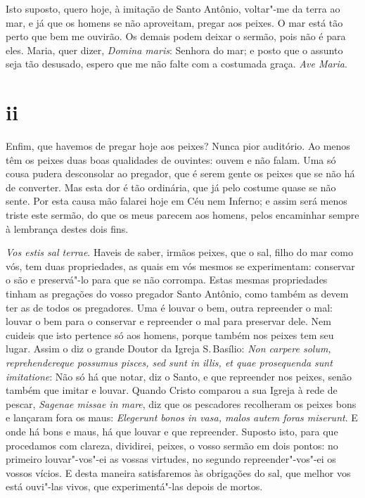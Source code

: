 Isto suposto, quero hoje, à imitação de Santo Antônio, voltar"-me da
terra ao mar, e já que os homens se não aproveitam, pregar aos peixes. O
mar está tão perto que bem me ouvirão. Os demais podem deixar o sermão,
pois não é para eles. Maria, quer dizer, \emph{Domina maris}: Senhora
do mar; e posto que o assunto seja tão desusado, espero que me não
falte com a costumada graça. \emph{Ave Maria}.

\section{ii}

Enfim, que havemos de pregar hoje aos peixes? Nunca pior auditório. Ao
menos têm os peixes duas boas qualidades de ouvintes: ouvem e não falam.
Uma só cousa pudera desconsolar ao pregador, que é serem gente os peixes
que se não há de converter. Mas esta dor é tão ordinária, que já pelo
costume quase se não sente. Por esta causa mão falarei hoje em Céu nem
Inferno; e assim será menos triste este sermão, do que os meus parecem
aos homens, pelos encaminhar sempre à lembrança destes dois fins.

\emph{Vos estis sal terrae}. Haveis de saber, irmãos peixes, que o sal,
filho do mar
como vós, tem duas propriedades, as quais em vós mesmos se experimentam:
conservar o são e preservá"-lo para que se não corrompa. Estas mesmas
propriedades tinham as pregações do vosso pregador Santo Antônio, como
também as devem ter as de todos os pregadores. Uma é louvar o bem, outra
repreender o mal: louvar o bem para o conservar e repreender o mal para
preservar dele. Nem cuideis que isto pertence só aos homens, porque
também nos peixes tem seu lugar. Assim o diz o grande Doutor da Igreja
S.\,Basílio: \emph{Non carpere solum, reprehendereque possumus pisces,
sed sunt in illis, et quae prosequenda sunt imitatione}: Não só há que
notar, diz o Santo, e que repreender nos peixes, senão também que imitar
e louvar. Quando Cristo comparou a sua Igreja à rede de pescar,
\emph{Sagenae missae in mare}, diz que os pescadores recolheram os
peixes bons e lançaram fora os maus: \emph{Elegerunt bonos in vasa,
malos autem foras miserunt}. E onde há bons e maus, há que louvar e que
repreender. Suposto isto,
para que procedamos com clareza, dividirei, peixes, o vosso sermão em
dois pontos: no primeiro louvar"-vos"-ei as vossas virtudes, no segundo
repreender"-vos"-ei os vossos vícios. E desta maneira satisfaremos às
obrigações do sal, que melhor vos está ouvi"-las vivos, que
experimentá"-las depois de mortos.

